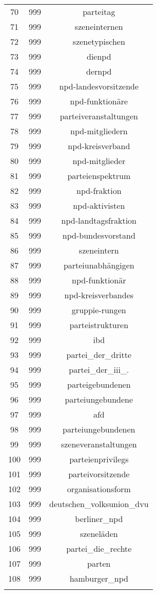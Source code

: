 \begin{table}[!htbp]
\begin{tabular}{@{\extracolsep{5pt}} ccc}
70 & 999 & parteitag \\ 
71 & 999 & szeneinternen \\ 
72 & 999 & szenetypischen \\ 
73 & 999 & dienpd \\ 
74 & 999 & dernpd \\ 
75 & 999 & npd-landesvorsitzende \\ 
76 & 999 & npd-funktionäre \\ 
77 & 999 & parteiveranstaltungen \\ 
78 & 999 & npd-mitgliedern \\ 
79 & 999 & npd-kreisverband \\ 
80 & 999 & npd-mitglieder \\ 
81 & 999 & parteienspektrum \\ 
82 & 999 & npd-fraktion \\ 
83 & 999 & npd-aktivisten \\ 
84 & 999 & npd-landtagsfraktion \\ 
85 & 999 & npd-bundesvorstand \\ 
86 & 999 & szeneintern \\ 
87 & 999 & parteiunabhängigen \\ 
88 & 999 & npd-funktionär \\ 
89 & 999 & npd-kreisverbandes \\ 
90 & 999 & gruppie-rungen \\ 
91 & 999 & parteistrukturen \\ 
92 & 999 & ibd \\ 
93 & 999 & partei\_der\_dritte \\ 
94 & 999 & partei\_der\_iii\_. \\ 
95 & 999 & parteigebundenen \\ 
96 & 999 & parteiungebundene \\ 
97 & 999 & afd \\ 
98 & 999 & parteiungebundenen \\ 
99 & 999 & szeneveranstaltungen \\ 
100 & 999 & parteienprivilegs \\ 
101 & 999 & parteivorsitzende \\ 
102 & 999 & organisationsform \\ 
103 & 999 & deutschen\_volksunion\_dvu \\ 
104 & 999 & berliner\_npd \\ 
105 & 999 & szeneläden \\ 
106 & 999 & partei\_die\_rechte \\ 
107 & 999 & parten \\ 
108 & 999 & hamburger\_npd \\ 
\hline \\[-1.8ex] 
\end{tabular} 
\end{table} 
